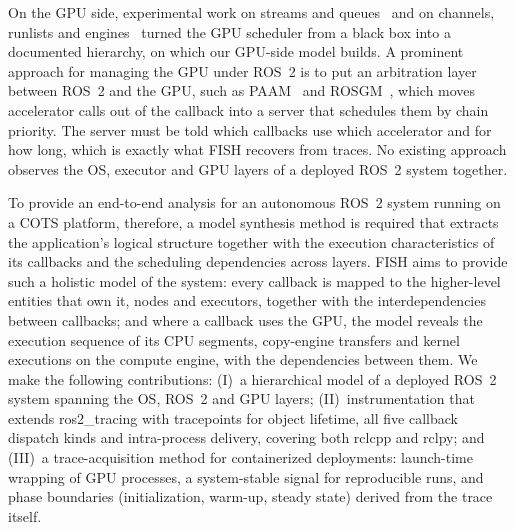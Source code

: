 On the GPU side, experimental work on streams and queues~\cite{otterness-17-inferringpolicies,amert-17-tx2review} and on channels, runlists and engines~\cite{bakita-24-demystify} turned the GPU scheduler from a black box into a documented hierarchy, on which our GPU-side model builds. A prominent approach for managing the GPU under ROS~2 is to put an arbitration layer between ROS~2 and the GPU, such as PAAM~\cite{enright-2024-paam} and ROSGM~\cite{li-2023-rosgm}, which moves accelerator calls out of the callback into a server that schedules them by chain priority. The server must be told which callbacks use which accelerator and for how long, which is exactly what FISH recovers from traces. No existing approach observes the OS, executor and GPU layers of a deployed ROS~2 system together.

To provide an end-to-end analysis for an autonomous ROS~2 system running on a COTS platform, therefore, a model synthesis method is required that extracts the application's logical structure together with the execution characteristics of its callbacks and the scheduling dependencies across layers. FISH aims to provide such a holistic model of the system: every callback is mapped to the higher-level entities that own it, nodes and executors, together with the interdependencies between callbacks; and where a callback uses the GPU, the model reveals the execution sequence of its CPU segments, copy-engine transfers and kernel executions on the compute engine, with the dependencies between them. We make the following contributions: (I)~a hierarchical model of a deployed ROS~2 system spanning the OS, ROS~2 and GPU layers; (II)~instrumentation that extends ros2\_tracing with tracepoints for object lifetime, all five callback dispatch kinds and intra-process delivery, covering both rclcpp and rclpy; and (III)~a trace-acquisition method for containerized deployments: launch-time wrapping of GPU processes, a system-stable signal for reproducible runs, and phase boundaries (initialization, warm-up, steady state) derived from the trace itself.
